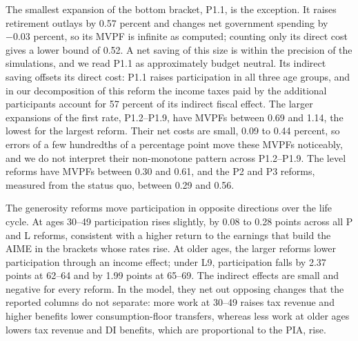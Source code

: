The smallest expansion of the bottom bracket, P1.1, is the exception. It raises retirement outlays by 0.57 percent and changes net government spending by $-0.03$ percent, so its MVPF is infinite as computed; counting only its direct cost gives a lower bound of 0.52. A net saving of this size is within the precision of the simulations, and we read P1.1 as approximately budget neutral. Its indirect saving offsets its direct cost: P1.1 raises participation in all three age groups, and in our decomposition of this reform the income taxes paid by the additional participants account for 57 percent of its indirect fiscal effect. %
The larger expansions of the first rate, P1.2--P1.9, have MVPFs between 0.69 and 1.14, the lowest for the largest reform. Their net costs are small, 0.09 to 0.44 percent, so errors of a few hundredths of a percentage point move these MVPFs noticeably, and we do not interpret their non-monotone pattern across P1.2--P1.9. The level reforms have MVPFs between 0.30 and 0.61, and the P2 and P3 reforms, measured from the status quo, between 0.29 and 0.56.

The generosity reforms move participation in opposite directions over the life cycle. At ages 30--49 participation rises slightly, by 0.08 to 0.28 points across all P and L reforms, consistent with a higher return to the earnings that build the AIME in the brackets whose rates rise. At older ages, the larger reforms lower participation through an income effect; under L9, participation falls by 2.37 points at 62--64 and by 1.99 points at 65--69. The indirect effects are small and negative for every reform. In the model, they net out opposing changes that the reported columns do not separate: more work at 30--49 raises tax revenue and higher benefits lower consumption-floor transfers, whereas less work at older ages lowers tax revenue and DI benefits, which are proportional to the PIA, rise.

